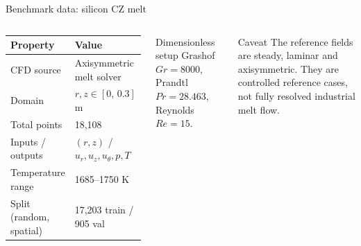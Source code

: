 \documentclass[aspectratio=169]{beamer}
\begin{document}
\begin{frame}{Benchmark data: silicon CZ melt}
\begin{columns}[T,onlytextwidth]
\begin{center}
\small
\begin{tabular}{ll}
\toprule
Property & Value \\
\midrule
CFD source & Axisymmetric melt solver \\
Domain & $r,z\in[0,\,0.3]$ m \\
Total points & 18,108 \\
Inputs / outputs & $(r,z)$ / $u_r,u_z,u_\theta,p,T$ \\
Temperature range & 1685--1750 K \\
Split (random, spatial) & 17,203 train / 905 val \\
\bottomrule
\end{tabular}
\end{center}
\begin{block}{Dimensionless setup}
Grashof $Gr=8000$, Prandtl $Pr=28.463$, Reynolds $Re=15$.
\end{block}
\begin{block}{Caveat}
The reference fields are steady, laminar and axisymmetric. They are controlled reference cases, not fully resolved industrial melt flow.
\end{block}
\end{columns}
\end{frame}
\end{document}
